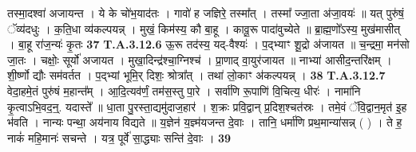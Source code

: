 \documentclass[17pt]{extarticle}
\begin{document}
                  तस्मा॒दश्वा॑ अजायन्त । ये के चो॑भ॒याद॑तः । गावो॑ ह जज्ञिरे॒ तस्मा᳚त् । तस्मा᳚ ज्जा॒ता अ॑जा॒वयः॑ ॥ यत् पुरु॑षं॒ ॅव्य॑दधुः । क॒ति॒धा व्य॑कल्पयन्न् । मुखं॒ किम॑स्य॒ कौ बा॒हू । कावू॒रू पादा॑वुच्येते ॥  ब्रा॒ह्म॒णो᳚ऽस्य॒ मुख॑मासीत् । बा॒हू रा॑ज॒न्यः॑ कृ॒तः \textbf{ 37} \newline
                  \newline
                                                                  \textbf{ T.A.3.12.6} \newline
                  ऊ॒रू तद॑स्य॒ यद्-वैश्यः॑ । प॒द्भ्याꣳ शू॒द्रो अ॑जायत ॥ च॒न्द्रमा॒ मन॑सो जा॒तः । चक्षोः॒ सूर्यो॑ अजायत ।  मुखा॒दिन्द्र॑श्चा॒ग्निश्च॑ । प्रा॒णाद् वा॒युर॑जायत ॥ नाभ्या॑ आसीद॒न्तरि॑क्षम् । शी॒र्ष्णो द्यौः सम॑वर्तत । प॒द्भ्यां भूमि॒र् दिशः॒ श्रोत्रा᳚त् ।  तथा॑ लो॒काꣳ अ॑कल्पयन्न् । \textbf{ 38} \newline
                  \newline
                                                                  \textbf{ T.A.3.12.7} \newline
                  वेदा॒हमे॒तं पुरु॑षं म॒हान्त᳚म् । आ॒दि॒त्यव॑र्णं॒ तम॑स॒स्तु पा॒रे । सर्वा॑णि रू॒पाणि॑ वि॒चित्य॒ धीरः॑ । नामा॑नि कृ॒त्वाऽभि॒वद॒न्॒. यदास्ते᳚ ॥  धा॒ता पु॒रस्ता॒द्यमु॑दाज॒हार॑ । श॒क्रः प्रवि॒द्वान् प्र॒दिश॒श्चत॑स्रः । तमे॒वं ॅवि॒द्वान॒मृत॑ इ॒ह भ॑वति । नान्यः पन्था॒ अय॑नाय विद्यते ॥  य॒ज्ञेन॑ य॒ज्ञ्म॑यजन्त दे॒वाः । तानि॒ धर्मा॑णि प्रथ॒मान्या॑सन्न् ( ) । ते ह॒ नाकं॑ महि॒मानः॑ सचन्ते । यत्र॒ पूर्वे॑ सा॒द्ध्याः सन्ति॑ दे॒वाः । \textbf{ 39} \newline
                  \newline
                                                  
\end{document}
